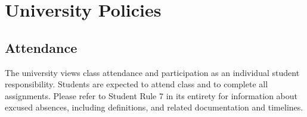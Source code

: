 \documentclass[11pt]{article}
\begin{document}

\small

\section*{University Policies}

\subsection*{Attendance}
The university views class attendance and participation as an individual student responsibility. Students are expected to attend class and to complete all assignments. Please refer to Student Rule 7 in its entirety for information about excused absences, including definitions, and related documentation and timelines.
\end{document}
